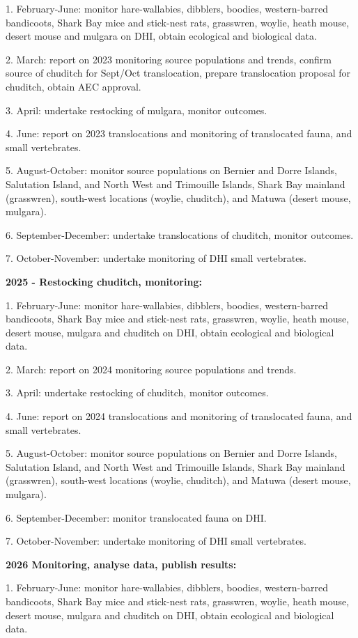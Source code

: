 \documentclass[version=last,
    paper=a4,                               %
    10pt,                                   %
    dvipsnames,
    oneside,                              %
    headings=openany,                       %
    open=any,
    BCOR=7mm,                               %
    DIV=15,     %
]{scrbook}
\begin{document}
1. February-June: monitor hare-wallabies, dibblers, boodies,
western-barred bandicoots, Shark Bay mice and stick-nest rats,
grasswren, woylie, heath mouse, desert mouse and mulgara on DHI, obtain
ecological and biological data.

2. March: report on 2023 monitoring source populations and trends,
confirm source of chuditch for Sept/Oct translocation, prepare
translocation proposal for chuditch, obtain AEC approval.

3. April: undertake restocking of mulgara, monitor outcomes.

4. June: report on 2023 translocations and monitoring of translocated
fauna, and small vertebrates.

5. August-October: monitor source populations on Bernier and Dorre
Islands, Salutation Island, and North West and Trimouille Islands, Shark
Bay mainland (grasswren), south-west locations (woylie, chuditch), and
Matuwa (desert mouse, mulgara).

6. September-December: undertake translocations of chuditch, monitor
outcomes.

7. October-November: undertake monitoring of DHI small vertebrates.

\textbf{2025 - Restocking chuditch, monitoring:}

1. February-June: monitor hare-wallabies, dibblers, boodies,
western-barred bandicoots, Shark Bay mice and stick-nest rats,
grasswren, woylie, heath mouse, desert mouse, mulgara and chuditch on
DHI, obtain ecological and biological data.

2. March: report on 2024 monitoring source populations and trends.

3. April: undertake restocking of chuditch, monitor outcomes.

4. June: report on 2024 translocations and monitoring of translocated
fauna, and small vertebrates.

5. August-October: monitor source populations on Bernier and Dorre
Islands, Salutation Island, and North West and Trimouille Islands, Shark
Bay mainland (grasswren), south-west locations (woylie, chuditch), and
Matuwa (desert mouse, mulgara).

6. September-December: monitor translocated fauna on DHI.

7. October-November: undertake monitoring of DHI small vertebrates.

\textbf{2026 Monitoring, analyse data, publish results:}

1. February-June: monitor hare-wallabies, dibblers, boodies,
western-barred bandicoots, Shark Bay mice and stick-nest rats,
grasswren, woylie, heath mouse, desert mouse, mulgara and chuditch on
DHI, obtain ecological and biological data.
\end{document}
